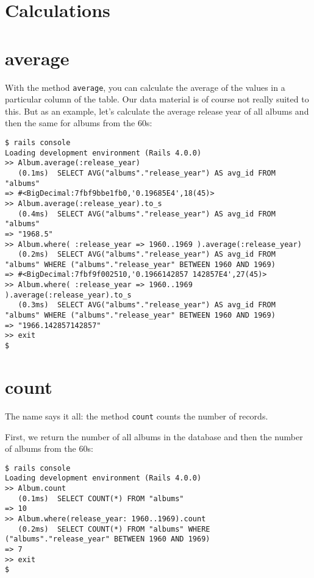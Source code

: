 \documentclass[a4paper]{book}
\newcounter{tab}[chapter]
\begin{document}
\section{Calculations}\label{calculations}

\section{average}\label{average}

With the method \texttt{average}, you can calculate the average of the values in a particular column of the table. Our data material is of course not really suited to this. But as an example, let's calculate the average release year of all albums and then the same for albums from the 60s:

\begin{shaded}\begin{verbatim}
$ rails console
Loading development environment (Rails 4.0.0)
>> Album.average(:release_year)
   (0.1ms)  SELECT AVG("albums"."release_year") AS avg_id FROM "albums"
=> #<BigDecimal:7fbf9bbe1fb0,'0.19685E4',18(45)>
>> Album.average(:release_year).to_s
   (0.4ms)  SELECT AVG("albums"."release_year") AS avg_id FROM "albums"
=> "1968.5"
>> Album.where( :release_year => 1960..1969 ).average(:release_year)
   (0.2ms)  SELECT AVG("albums"."release_year") AS avg_id FROM "albums" WHERE ("albums"."release_year" BETWEEN 1960 AND 1969)
=> #<BigDecimal:7fbf9f002510,'0.1966142857 142857E4',27(45)>
>> Album.where( :release_year => 1960..1969 ).average(:release_year).to_s
   (0.3ms)  SELECT AVG("albums"."release_year") AS avg_id FROM "albums" WHERE ("albums"."release_year" BETWEEN 1960 AND 1969)
=> "1966.142857142857"
>> exit
$
\end{verbatim}\end{shaded}

\section{count}\label{count}

The name says it all: the method \texttt{count} counts the number of records.

First, we return the number of all albums in the database and then the number of albums from the 60s:

\begin{shaded}\begin{verbatim}
$ rails console
Loading development environment (Rails 4.0.0)
>> Album.count
   (0.1ms)  SELECT COUNT(*) FROM "albums"
=> 10
>> Album.where(release_year: 1960..1969).count
   (0.2ms)  SELECT COUNT(*) FROM "albums" WHERE ("albums"."release_year" BETWEEN 1960 AND 1969)
=> 7
>> exit
$
\end{verbatim}\end{shaded}
\end{document}
